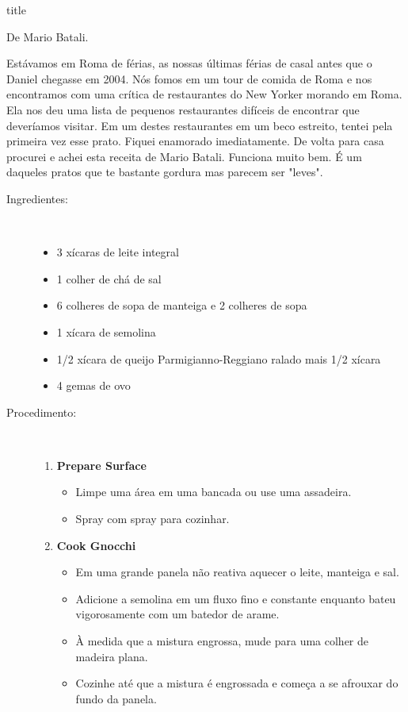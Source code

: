 \documentclass [11pt, letterpaper] {article}
\begin{document}
 {title}

\begin {flushright}
{De Mario Batali.}
\end {flushright}

Estávamos em Roma de férias, as nossas \'ultimas férias de casal antes que o Daniel chegasse em 2004. Nós fomos em um tour de comida de Roma e nos encontramos com uma crítica de restaurantes do New Yorker morando em Roma. Ela nos deu uma lista de pequenos restaurantes difíceis de encontrar que dever\'iamos visitar. Em um destes restaurantes em um beco estreito, tentei pela primeira vez esse prato. Fiquei enamorado imediatamente. De volta para casa procurei e achei esta receita de Mario Batali. Funciona muito bem. É um daqueles pratos que te bastante gordura mas parecem ser "leves".

\begin {description}

\item [Ingredientes:] \ \\
\begin {itemize}
\item 3 xícaras de leite integral
\item 1 colher de chá de sal
\item 6 colheres de sopa de manteiga e 2 colheres de sopa
\item 1 xícara de semolina
\item 1/2 xícara de queijo Parmigianno-Reggiano ralado mais 1/2 xícara
\item 4 gemas de ovo
\end {itemize}

\item [Procedimento:] \ \\

\begin {enumerate}
\item {\bf Prepare Surface}
\begin {itemize}
\item Limpe uma área em uma bancada ou use uma assadeira.
\item Spray com spray para cozinhar.
\end {itemize}

\item {\bf Cook Gnocchi}
\begin {itemize}
\item Em uma grande panela não reativa aquecer o leite, manteiga e sal.
\item Adicione a semolina em um fluxo fino e constante enquanto bateu vigorosamente com um batedor de arame.
\item À medida que a mistura engrossa, mude para uma colher de madeira plana.
\item Cozinhe até que a mistura é engrossada e começa a se afrouxar do fundo da panela.
\end {itemize}


\end{enumerate}
\end{description}
\end{document}
